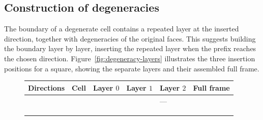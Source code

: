\documentclass[a4paper,UKenglish,cleveref,autoref]{lipics-v2021}
\newcommand{\smfontsize}{\fontsize{8}{11}\selectfont}
\begin{document}
\subsection{Construction of degeneracies}
The boundary of a degenerate cell contains a repeated layer at the inserted direction, together with degeneracies of the original faces. This suggests building the boundary layer by layer, inserting the repeated layer when the prefix reaches the chosen direction. Figure~\ref{fig:degeneracy-layers} illustrates the three insertion positions for a square, showing the separate layers and their assembled full frame.

\begin{figure}[tbp]
  \centering
  \begingroup
  
  \smfontsize
  \setlength{\tabcolsep}{3pt}
  \begin{tabularx}{\linewidth}{@{}YYYYYY@{}}
    \toprule
    Directions                             & Cell                                                      & Layer $0$ & Layer $1$ & Layer $2$ & Full frame \\
    \midrule
    \cubePicture{\cubeSourceAxes}          & \cubePicture{\cubeSourceCell}                             &
    \cubePicture{\cubeSourceLayerFirst}    & \cubePicture{\cubeSourceLayerSecond}                      &
    ---                                    & \cubePicture{\cubeSourceLayerFirst\cubeSourceLayerSecond}                                                  \\\addlinespace[0.7em]
    \cubePicture{\cubeFirstAxes}           & \cubePicture{\cubeFirstCell}                              &
    \cubePicture{\cubeFirstLayerFirst}     & \cubePicture{\cubeFirstLayerSecond}                       &
    \cubePicture{\cubeFirstLayerThird}     &
    \cubePicture{\cubeFirstLayerFirst\cubeFirstLayerSecond\cubeFirstLayerThird}                                                                         \\\addlinespace[0.7em]
    \cubePicture{\cubeMiddleAxes}          & \cubePicture{\cubeMiddleCell}                             &
    \cubePicture{\cubeMiddleLayerFirst}    & \cubePicture{\cubeMiddleLayerSecond}                      &
    \cubePicture{\cubeMiddleLayerThird}    &
    \cubePicture{\cubeMiddleLayerFirst\cubeMiddleLayerSecond\cubeMiddleLayerThird}                                                                      \\\addlinespace[0.7em]
    \cubePicture{\cubeLastAxes}            & \cubePicture{\cubeLastCell}                               &

\end{tabularx}
\end{figure}
\end{document}

